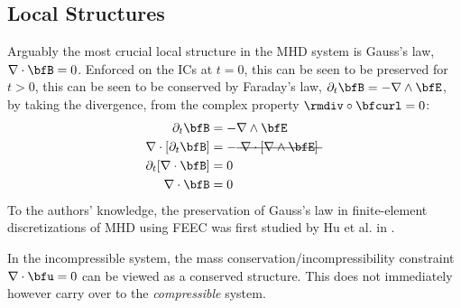 \subsection*{Local Structures}
    Arguably the most crucial local structure in the MHD system is Gauss's law, $\nabla\cdot\bfB  =  0$. Enforced on the ICs at $t  =  0$, this can be seen to be preserved for $t  >  0$, this can be seen to be conserved by Faraday's law, $\partial_{t}\bfB  =  - \nabla\wedge\bfE$, by taking the divergence, from the complex property $\rmdiv\circ\bfcurl  =  0$: \cite{Stratton_1941, Rosen_1980, Freistühler_Warnecke_2002}
    \begin{align}
                    \partial_{t}\bfB   &=  - \nabla\wedge\bfE  \\
        \nabla\cdot[\partial_{t}\bfB]  &=  - \mst{\nabla\cdot[\nabla\wedge\bfE]}  \\
        \partial_{t}[\nabla\cdot\bfB]  &=  0  \\
                     \nabla\cdot\bfB   &=  0
    \end{align}
    To the authors' knowledge, the preservation of Gauss's law in finite-element discretizations of MHD using FEEC was first studied by Hu et al. in \cite{Hu_Xu_2015, Hu_Ma_Xu_2017}.

    \begin{remark}
        In the incompressible system, the mass conservation/incompressibility constraint $\nabla\cdot\bfu  =  0$ can be viewed as a conserved structure. This does not immediately however carry over to the \emph{compressible} system.
    \end{remark}
